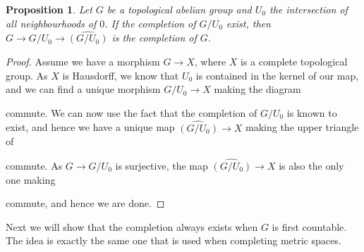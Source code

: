 \documentclass[12pt,a4paper,leqno]{article}
\theoremstyle{plain}
\newtheorem{prop}[theo]{Proposition}
\theoremstyle{definition}
\theoremstyle{remark}
\begin{document}
\begin{prop}
Let $G$ be a topological abelian group and $U_0$ the intersection of all neighbourhoods of $0$. If the completion of $G/U_0$ exist, then $G \to G/U_0 \to \widehat{(G/U_0)}$ is the completion of $G$.
\end{prop}
\begin{proof}
Assume we have a morphism $G \to X$, where $X$ is a complete topological group. As $X$ is Hausdorff, we know that $U_0$ is contained in the kernel of our map, and we can find a unique morphism $G / U_0 \to X$ making the diagram
\begin{center}
\end{center}
commute. We can now use the fact that the completion of $G / U_0$ is known to exist, and hence we have a unique map $\widehat {(G/U_0)} \to X$ making the upper triangle of
\begin{center}
\end{center}
commute. As $G \to G/U_0$ is surjective, the map $\widehat {(G/U_0)} \to X$ is also the only one making
\begin{center}
\end{center}
commute, and hence we are done.
\end{proof}

Next we will show that the completion always exists when $G$ is first countable. The idea is exactly the same one that is used when completing metric spaces.
\end{document}
